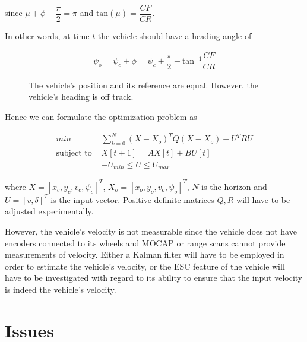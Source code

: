 \documentclass[oneside,12pt]{article}
\begin{document}
    since $\mu + \phi + \dfrac{\pi}{2} = \pi$ and $\text{tan}(\mu) = \dfrac{CF}{CR}$.

    In other words, at time $t$ the vehicle should have a heading angle of

    \begin{align}
      \psi_o = \psi_c + \phi = \psi_c + \dfrac{\pi}{2} - \text{tan}^{-1}\dfrac{CF}{CR}
    \end{align}


    \begin{figure}[H]\centering
      \scalebox{1}{}
      \caption{The vehicle's position and its reference are equal. However,
        the vehicle's heading is off track.}
      \label{}
    \end{figure}

    Hence we can formulate the optimization problem as

    \begin{align}
      min &\sum\limits_{k=0}^N (X-X_o)^T Q (X-X_o) + U^T R U \\
      \text{subject to } & X[t+1] = A X[t] + B U[t] \\
      & -U_{min} \leq U \leq U_{max}
    \end{align}

    where $X=[x_c, y_c, v_c, \psi_c]^T$, $X_o = [x_o, y_o, v_o, \psi_o]^T$,
    $N$ is the horizon and $U=[v, \delta]^T$ is the input vector.
    Positive definite matrices $Q,R$ will have to be adjusted experimentally.

    However, the vehicle's velocity is not measurable since the vehicle does not
    have encoders connected to its wheels and MOCAP or range scans cannot
    provide measurements of velocity. Either a Kalman filter will have to be
    employed in order to estimate the vehicle's velocity, or the ESC feature of
    the vehicle will have to be investigated with regard to its ability to
    ensure that the input velocity is indeed the vehicle's velocity.



\section{Issues}
\end{document}
